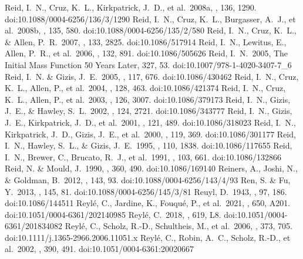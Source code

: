 \documentclass[twocolumn,tighten,twocolappendix]{aastex631}
\begin{document}
\begin{thebibliography}{}
 Reid, I.~N., Cruz, K.~L., Kirkpatrick, J.~D., et al.\ 2008a, \aj, 136, 1290. doi:10.1088/0004-6256/136/3/1290
 Reid, I.~N., Cruz, K.~L., Burgasser, A.~J., et al.\ 2008b, \aj, 135, 580. doi:10.1088/0004-6256/135/2/580
 Reid, I.~N., Cruz, K.~L., \& Allen, P.~R.\ 2007, \aj, 133, 2825. doi:10.1086/517914
 Reid, I.~N., Lewitus, E., Allen, P.~R., et al.\ 2006, \aj, 132, 891. doi:10.1086/505626
 Reid, I.~N.\ 2005, The Initial Mass Function 50 Years Later, 327, 53. doi:10.1007/978-1-4020-3407-7\_6
 Reid, I.~N. \& Gizis, J.~E.\ 2005, \pasp, 117, 676. doi:10.1086/430462
 Reid, I.~N., Cruz, K.~L., Allen, P., et al.\ 2004, \aj, 128, 463. doi:10.1086/421374
 Reid, I.~N., Cruz, K.~L., Allen, P., et al.\ 2003, \aj, 126, 3007. doi:10.1086/379173
 Reid, I.~N., Gizis, J.~E., \& Hawley, S.~L.\ 2002, \aj, 124, 2721. doi:10.1086/343777
 Reid, I.~N., Gizis, J.~E., Kirkpatrick, J.~D., et al.\ 2001, \aj, 121, 489. doi:10.1086/318023
 Reid, I.~N., Kirkpatrick, J.~D., Gizis, J.~E., et al.\ 2000, \aj, 119, 369. doi:10.1086/301177
 Reid, I.~N., Hawley, S.~L., \& Gizis, J.~E.\ 1995, \aj, 110, 1838. doi:10.1086/117655
 Reid, I.~N., Brewer, C., Brucato, R.~J., et al.\ 1991, \pasp, 103, 661. doi:10.1086/132866
 Reid, N. \& Mould, J.\ 1990, \apj, 360, 490. doi:10.1086/169140
 Reiners, A., Joshi, N., \& Goldman, B.\ 2012, \aj, 143, 93. doi:10.1088/0004-6256/143/4/93
 Ren, S. \& Fu, Y.\ 2013, \aj, 145, 81. doi:10.1088/0004-6256/145/3/81
 Reuyl, D.\ 1943, \apj, 97, 186. doi:10.1086/144511
 Reyl{\'e}, C., Jardine, K., Fouqu{\'e}, P., et al.\ 2021, \aap, 650, A201. doi:10.1051/0004-6361/202140985
 Reyl{\'e}, C.\ 2018, \aap, 619, L8. doi:10.1051/0004-6361/201834082
 Reyl{\'e}, C., Scholz, R.-D., Schultheis, M., et al.\ 2006, \mnras, 373, 705. doi:10.1111/j.1365-2966.2006.11051.x
 Reyl{\'e}, C., Robin, A.~C., Scholz, R.-D., et al.\ 2002, \aap, 390, 491. doi:10.1051/0004-6361:20020667

\end{thebibliography}
\end{document}
